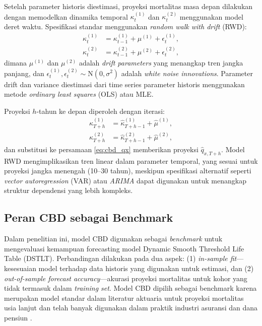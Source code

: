Setelah parameter historis diestimasi, proyeksi mortalitas masa depan dilakukan dengan memodelkan dinamika temporal $\kappa_t^{(1)}$ dan $\kappa_t^{(2)}$ menggunakan model deret waktu. Spesifikasi standar menggunakan \textit{random walk with drift} (RWD):
\begin{align}
\kappa_t^{(1)} &= \kappa_{t-1}^{(1)} + \mu^{(1)} + \epsilon_t^{(1)}, \label{eq:cbd_rw1} \\
\kappa_t^{(2)} &= \kappa_{t-1}^{(2)} + \mu^{(2)} + \epsilon_t^{(2)}, \label{eq:cbd_rw2}
\end{align}
dimana $\mu^{(1)}$ dan $\mu^{(2)}$ adalah \textit{drift parameters} yang menangkap tren jangka panjang, dan $\epsilon_t^{(1)}, \epsilon_t^{(2)} \sim \text{N}(0, \sigma^2)$ adalah \textit{white noise innovations}. Parameter drift dan variance diestimasi dari time series parameter historis menggunakan metode \textit{ordinary least squares} (OLS) atau MLE.

Proyeksi $h$-tahun ke depan diperoleh dengan iterasi:
\begin{align}
\hat{\kappa}_{T+h}^{(1)} &= \hat{\kappa}_{T+h-1}^{(1)} + \hat{\mu}^{(1)}, \\
\hat{\kappa}_{T+h}^{(2)} &= \hat{\kappa}_{T+h-1}^{(2)} + \hat{\mu}^{(2)},
\end{align}
dan substitusi ke persamaan \eqref{eq:cbd_qx} memberikan proyeksi $\hat{q}_{x,T+h}$. Model RWD mengimplikasikan tren linear dalam parameter temporal, yang sesuai untuk proyeksi jangka menengah (10--30 tahun), meskipun spesifikasi alternatif seperti \textit{vector autoregression} (VAR) atau \textit{ARIMA} dapat digunakan untuk menangkap struktur dependensi yang lebih kompleks.

\subsection{Peran CBD sebagai Benchmark}

Dalam penelitian ini, model CBD digunakan sebagai \textit{benchmark} untuk mengevaluasi kemampuan forecasting model Dynamic Smooth Threshold Life Table (DSTLT). Perbandingan dilakukan pada dua aspek: (1) \textit{in-sample fit}—kesesuaian model terhadap data historis yang digunakan untuk estimasi, dan (2) \textit{out-of-sample forecast accuracy}—akurasi proyeksi mortalitas untuk kohor yang tidak termasuk dalam \textit{training set}. Model CBD dipilih sebagai benchmark karena merupakan model standar dalam literatur aktuaria untuk proyeksi mortalitas usia lanjut dan telah banyak digunakan dalam praktik industri asuransi dan dana pensiun \citep{villegas2018comparative, cairns2011quantitative}.

